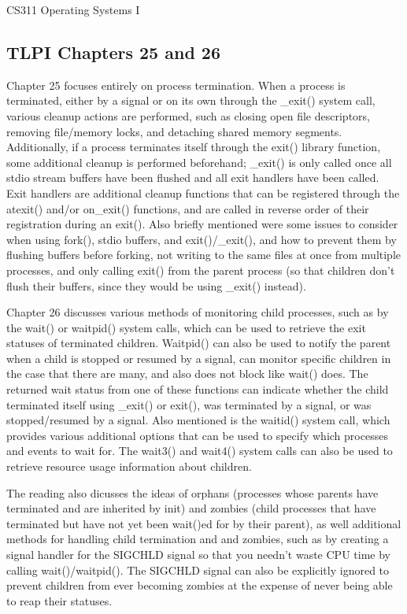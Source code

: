 \documentclass[letterpaper,10pt,fleqn]{article}
\numberwithin{equation}{section}
\begin{document}



{\Large CS311 Operating Systems I}

\subsection*{TLPI Chapters 25 and 26}

Chapter 25 focuses entirely on process termination.  When a process is terminated, either by a signal or on its own through the \_exit() system call, various cleanup actions are performed, such as closing open file descriptors, removing file/memory locks, and detaching shared memory segments.  Additionally, if a process terminates itself through the exit() library function, some additional cleanup is performed beforehand; \_exit() is only called once all stdio stream buffers have been flushed and all exit handlers have been called.  Exit handlers are additional cleanup functions that can be registered through the atexit() and/or on\_exit() functions, and are called in reverse order of their registration during an exit().  Also briefly mentioned were some issues to consider when using fork(), stdio buffers, and exit()/\_exit(), and how to prevent them by flushing buffers before forking, not writing to the same files at once from multiple processes, and only calling exit() from the parent process (so that children don't flush their buffers, since they would be using \_exit() instead).

Chapter 26 discusses various methods of monitoring child processes, such as by the wait() or waitpid() system calls, which can be used to retrieve the exit statuses of terminated children.  Waitpid() can also be used to notify the parent when a child is stopped or resumed by a signal, can monitor specific children in the case that there are many, and also does not block like wait() does.  The returned wait status from one of these functions can indicate whether the child terminated itself using \_exit() or exit(), was terminated by a signal, or was stopped/resumed by a signal.  Also mentioned is the waitid() system call, which provides various additional options that can be used to specify which processes and events to wait for.  The wait3() and wait4() system calls can also be used to retrieve resource usage information about children.

The reading also dicusses the ideas of orphans (processes whose parents have terminated and are inherited by init) and zombies (child processes that have terminated but have not yet been wait()ed for by their parent), as well additional methods for handling child termination and and zombies, such as by creating a signal handler for the SIGCHLD signal so that you needn't waste CPU time by calling wait()/waitpid().  The SIGCHLD signal can also be explicitly ignored to prevent children from ever becoming zombies at the expense of never being able to reap their statuses.
\end{document}
